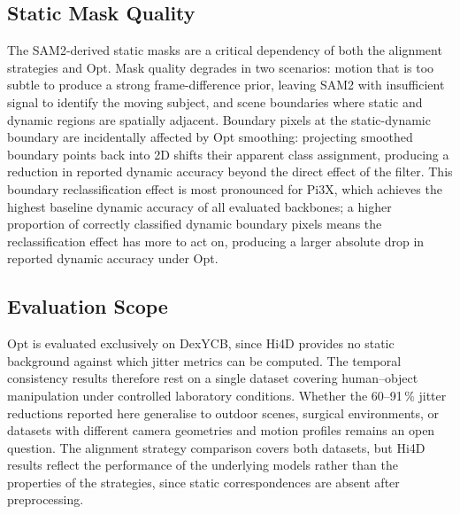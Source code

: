 \subsection{Static Mask Quality}
The SAM2-derived static masks are a critical dependency of both the alignment
strategies and Opt. Mask quality degrades in two scenarios: motion that is too
subtle to produce a strong frame-difference prior, leaving SAM2 with insufficient
signal to identify the moving subject, and scene boundaries where static and
dynamic regions are spatially adjacent. Boundary pixels at the static-dynamic
boundary are incidentally affected by Opt smoothing: projecting smoothed boundary
points back into 2D shifts their apparent class assignment, producing a reduction
in reported dynamic accuracy beyond the direct effect of the filter. This boundary
reclassification effect is most pronounced for Pi3X, which achieves the highest
baseline dynamic accuracy of all evaluated backbones; a higher proportion of
correctly classified dynamic boundary pixels means the reclassification effect
has more to act on, producing a larger absolute drop in reported dynamic accuracy
under Opt.

\subsection{Evaluation Scope}
Opt is evaluated exclusively on DexYCB, since Hi4D provides no static background
against which jitter metrics can be computed. The temporal consistency results
therefore rest on a single dataset covering human--object manipulation under controlled
laboratory conditions. Whether the 60--91\,\% jitter reductions reported here
generalise to outdoor scenes, surgical environments, or datasets with different camera
geometries and motion profiles remains an open question. The alignment strategy
comparison covers both datasets, but Hi4D results reflect the performance of the
underlying models rather than the properties of the strategies, since static
correspondences are absent after preprocessing.

